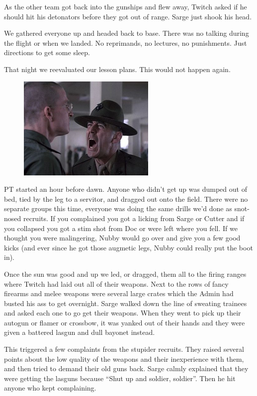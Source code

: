 As the other team got back into the gunships and flew away, Twitch asked if he should hit his detonators before they got out of range. 
Sarge just shook his head. 


We gathered everyone up and headed back to base. 
There was no talking during the flight or when we landed. 
No reprimands, no lectures, no punishments. 
Just directions to get some sleep.

That night we reevaluated our lesson plans. 
This would not happen again.

\begin{figure}
	\begin{center}
		\includegraphics[width=\figwidth]{pics/8/22.png}
	\end{center}
\end{figure}
PT started an hour before dawn. 
Anyone who didn’t get up was dumped out of bed, tied by the leg to a servitor, and dragged out onto the field. 
There were no separate groups this time, everyone was doing the same drills we’d done as snot-nosed recruits. 
If you complained you got a licking from Sarge or Cutter and if you collapsed you got a stim shot from Doc or were left where you fell. 
If we thought you were malingering, Nubby would go over and give you a few good kicks (and ever since he got those augmetic legs, Nubby could really put the boot in).

Once the sun was good and up we led, or dragged, them all to the firing ranges where Twitch had laid out all of their weapons. 
Next to the rows of fancy firearms and melee weapons were several large crates which the Admin had busted his ass to get overnight. 
Sarge walked down the line of sweating trainees and asked each one to go get their weapons. 
When they went to pick up their autogun or flamer or crossbow, it was yanked out of their hands and they were given a battered lasgun and dull bayonet instead. 


This triggered a few complaints from the stupider recruits. 
They raised several points about the low quality of the weapons and their inexperience with them, and then tried to demand their old guns back. 
Sarge calmly explained that they were getting the lasguns because “Shut up and soldier, soldier”. 
Then he hit anyone who kept complaining.

